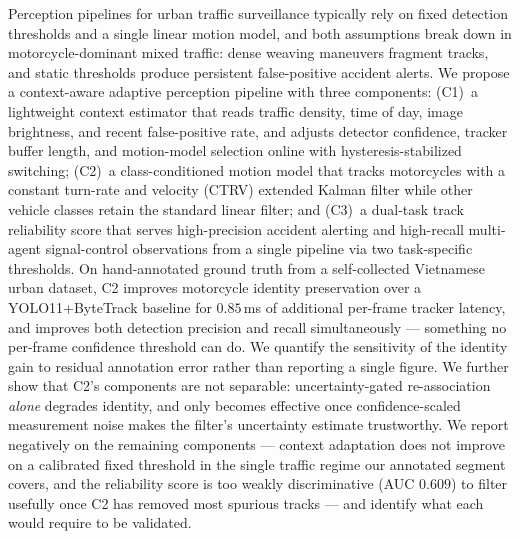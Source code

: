 Perception pipelines for urban traffic surveillance typically rely on
fixed detection thresholds and a single linear motion model, and both
assumptions break down in motorcycle-dominant mixed traffic: dense
weaving maneuvers fragment tracks, and static thresholds produce
persistent false-positive accident alerts.
%
We propose a context-aware adaptive perception pipeline with three
components: (C1)~a lightweight context estimator that reads traffic
density, time of day, image brightness, and recent false-positive rate,
and adjusts detector confidence, tracker buffer length, and motion-model
selection online with hysteresis-stabilized switching; (C2)~a
class-conditioned motion model that tracks motorcycles with a constant
turn-rate and velocity (CTRV) extended Kalman filter while other vehicle
classes retain the standard linear filter; and (C3)~a dual-task track
reliability score that serves high-precision accident alerting and
high-recall multi-agent signal-control observations from a single
pipeline via two task-specific thresholds.
%
On hand-annotated ground truth from a self-collected Vietnamese urban
dataset, C2 improves motorcycle identity preservation over a
YOLO11+ByteTrack baseline for $0.85$\,ms of additional per-frame tracker
latency, and improves both detection precision and recall simultaneously
--- something no per-frame confidence threshold can do.
We quantify the sensitivity of the identity gain to residual annotation
error rather than reporting a single figure.
We further show that C2's components are not separable: uncertainty-gated
re-association \emph{alone} degrades identity, and only becomes effective
once confidence-scaled measurement noise makes the filter's uncertainty
estimate trustworthy.
We report negatively on the remaining components --- context adaptation
does not improve on a calibrated fixed threshold in the single traffic
regime our annotated segment covers, and the reliability score is too
weakly discriminative (AUC $0.609$) to filter usefully once C2 has
removed most spurious tracks --- and identify what each would require to
be validated.

